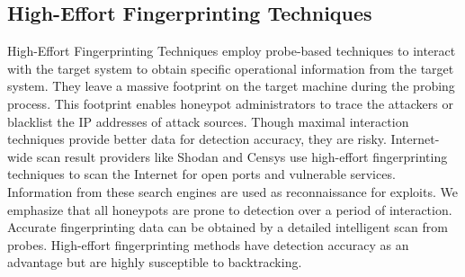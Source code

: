  
 \subsection{High-Effort Fingerprinting Techniques}
High-Effort Fingerprinting Techniques employ probe-based techniques to interact with the target system to obtain specific operational information from the target system. They leave a massive footprint on the target machine during the probing process. This footprint enables honeypot administrators to trace the attackers or blacklist the IP addresses of attack sources. Though maximal interaction techniques provide better data for detection accuracy, they are risky. Internet-wide scan result providers like Shodan and Censys use high-effort fingerprinting techniques to scan the Internet for open ports and vulnerable services. Information from these search engines are used as reconnaissance for exploits. We emphasize that all honeypots are prone to detection over a period of interaction. Accurate fingerprinting data can be obtained by a detailed intelligent scan from probes. High-effort fingerprinting methods have detection accuracy as an advantage but are highly susceptible to backtracking. 
